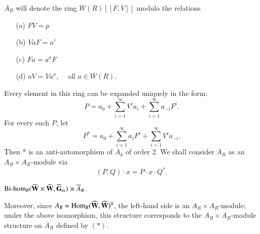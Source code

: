 \begin{defi*}
$\overline{A}_{R}$ will denote the ring $W(R)[[F,V]]$ modulo the relations
\begin{itemize}
\item[\rm(a)] $FV=p$

\item[\rm(b)] $VaF=a'$

\item[\rm(c)] $Fa=a^{\sigma}F$

\item[\rm(d)] $aV=Va^{\sigma}$, \ \ all $a\in W(R)$.
\end{itemize}
\end{defi*}
Every element in this ring can be expanded uniquely in the form:
$$
P=a_{0}+\sum\limits^{\infty}_{i=1}V^{i}a_{i}+\sum\limits^{\infty}_{i=1}a_{-i}F^{i}.
$$
For every such $P$, let
$$
P^{*}=a_{0}+\sum\limits^{\infty}_{i=1}a_{i}F^{i}+\sum\limits^{\infty}_{i=1}V^{i}a_{-i}.
$$\pageoriginale
Then * is an anti-automorphism of $\overline{A}_{k}$ of order 2. We shall consider $\overline{A}_{R}$ as an $A_{R}\times A_{R}$-module via
\begin{equation*}
(P,Q)\cdot x=P\cdot x\cdot Q^{*}.\tag{*}
\end{equation*}

\begin{proposition}\label{art15-prop3}
$\text{\rm Bi-hom}_{R} (\widehat{\mathbf{W}}\times \widehat{\mathbf{W}},\widehat{\mathbf{G}}_{m})\cong \overline{A}_{R}$.

\noindent
Moreover, since $A_{R}=\operatorname{\mathrm{Hom}}_{R}(\widehat{\mathbf{W}},\widehat{\mathbf{W}})^{0}$, the left-hand side is an $A_{R}\times A_{R}$-module; under the above isomorphism, this structure corresponds to the $A_{R}\times A_{R}$-module structure on $\overline{A}_{R}$ defined by $(*)$.
\end{proposition}

